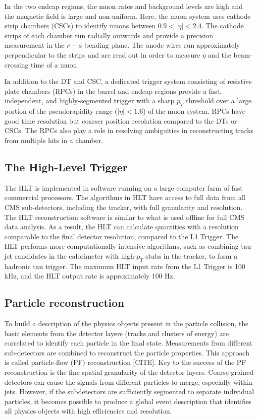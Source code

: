 \documentclass{article}
\begin{document}
In the two endcap regions, the muon rates and background levels are high and the magnetic field is large and non-uniform. Here, the muon system uses cathode strip chambers (CSCs) to identify muons between $0.9 < |\eta| < 2.4$. The cathode strips of each chamber run radially outwards and provide a precision measurement in the $r-\phi$ bending plane. The anode wires run approximately perpendicular to the strips and are read out in order to measure $\eta$ and the beam-crossing time of a muon. 

In addition to the DT and CSC, a dedicated trigger system consisting of resistive plate chambers (RPCs) in the barrel and endcap regions provide a fast, independent, and highly-segmented trigger with a sharp $p_T$ threshold over a large portion of the pseudorapidity range ($|\eta| < 1.6$) of the muon system. RPCs have good time resolution but coarser position resolution compared to the DTs or CSCs. The RPCs also play a role in resolving ambiguities in reconstructing tracks from multiple hits in a chamber. 

\subsection{The High-Level Trigger}
\label{section:phase-1-high-level-trigger}
The HLT is implemented in software running on a large computer farm of fast commercial processors. The algorithms in HLT have access to full data from all CMS sub-detectors, including the tracker, with full granularity and resolution. The HLT reconstruction software is similar to what is used offline for full CMS data analysis. As a result, the HLT can calculate quantities with a resolution comparable to the final detector resolution, compared to the L1 Trigger. The HLT performs more computationally-intensive algorithms, such as combining tau-jet candidates in the calorimeter with high-$p_T$ stubs in the tracker, to form a hadronic tau trigger. The maximum HLT input rate from the L1 Trigger is 100 kHz, and the HLT output rate is approximately 100 Hz. 

\subsection{Particle reconstruction}
To build a description of the physics objects present in the particle collision, the basic elements from the detector layers (tracks and clusters of energy) are correlated to identify each particle in the final state. Measurements from different sub-detectors are combined to reconstruct the particle properties. This approach is called particle-flow (PF) reconstruction [CITE]. Key to the success of the PF reconstruction is the fine spatial granularity of the detector layers. Coarse-grained detectors can cause the signals from different particles to merge, especially within jets. However, if the subdetectors are sufficiently segmented to separate individual particles, it becomes possible to produce a global event description that identifies all physics objects with high efficiencies and resolution.
\end{document}
